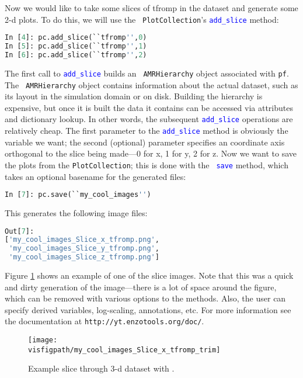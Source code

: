 Now we would like to take some slices of tfromp in the dataset and
generate some 2-d plots.  To do this, we will use the {\tt
  PlotCollection}'s \textcolor{blue}{\tt add\_slice} method:
\begin{lstlisting}[language=Python]
In [4]: pc.add_slice(``tfromp'',0)
In [5]: pc.add_slice(``tfromp'',1)
In [6]: pc.add_slice(``tfromp'',2)
\end{lstlisting}
The first call to \textcolor{blue}{\tt add\_slice} builds an {\tt
  AMRHierarchy} object associated with {\tt pf}.  The {\tt
  AMRHierarchy} object contains information about the actual dataset,
such as its layout in the simulation domain or on disk.  Building the
hierarchy is expensive, but once it is built the data it contains can
be accessed via attributes and dictionary lookup.  In other words, the
subsequent \textcolor{blue}{\tt add\_slice} operations are relatively
cheap.  The first parameter to the \textcolor{blue}{\tt add\_slice}
method is obviously the variable we want; the second (optional)
parameter specifies an coordinate axis orthogonal to the slice being
made---0 for x, 1 for y, 2 for z.  Now we want to save the plots from
the {\tt PlotCollection}; this is done with the \textcolor{blue}{\tt
  save} method, which takes an optional basename for the generated files:
\begin{lstlisting}[language=Python]
In [7]: pc.save(``my_cool_images'')
\end{lstlisting}
This generates the following image files:
\begin{lstlisting}[language=Python]
Out[7]: 
['my_cool_images_Slice_x_tfromp.png',
 'my_cool_images_Slice_y_tfromp.png',
 'my_cool_images_Slice_z_tfromp.png']
\end{lstlisting}
Figure \ref{fig:yt_slice} shows an example of one of the slice images.
Note that this was a quick and dirty generation of the image---there
is a lot of space around the figure, which can be removed with various
options to the \yt methods.  Also, the user can specify derived
variables, log-scaling, annotations, etc. For more information see the
documentation at {\tt http://yt.enzotools.org/doc/}.

\begin{figure}[!h]\label{fig:yt_slice}
\centering
\texttt{[image: \\visfigpath/my\_cool\_images\_Slice\_x\_tfromp\_trim]}
\caption{Example slice through 3-d dataset with \yt.}
\end{figure}


